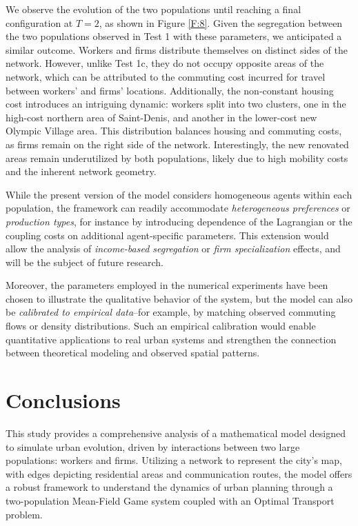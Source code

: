 \documentclass[smallextended,referee,envcountsect,]{svjour3}
\begin{document}
We observe the evolution of the two populations until reaching a final configuration at \(T = 2\), as shown in Figure \ref{F:8}. Given the segregation between the two populations observed in Test 1 with these parameters, we anticipated a similar outcome. Workers and firms distribute themselves on distinct sides of the network. However, unlike Test 1c, they do not occupy opposite areas of the network, which can be attributed to the commuting cost incurred for travel between workers' and firms' locations. Additionally, the non-constant housing cost introduces an intriguing dynamic: workers split into two clusters, one in the high-cost northern area of Saint-Denis, and another in the lower-cost new Olympic Village area. This distribution balances housing and commuting costs, as firms remain on the right side of the network. Interestingly, the new renovated areas remain underutilized by both populations, likely due to high mobility costs and the inherent network geometry.

{
While the present version of the model considers homogeneous agents within each population, 
the framework can readily accommodate \emph{heterogeneous preferences} or \emph{production types}, 
for instance by introducing dependence of the Lagrangian or the coupling costs on additional agent-specific parameters. 
This extension would allow the analysis of \emph{income-based segregation} or \emph{firm specialization} effects, 
and will be the subject of future research. 

Moreover, the parameters employed in the numerical experiments have been chosen to illustrate the qualitative behavior of the system, 
but the model can also be \emph{calibrated to empirical data}--for example, by matching observed commuting flows or density distributions. 
Such an empirical calibration would enable quantitative applications to real urban systems 
and strengthen the connection between theoretical modeling and observed spatial patterns.}






\section{Conclusions}

This study provides a comprehensive analysis of a mathematical model designed to simulate urban evolution, driven by interactions between two large populations: workers and firms. Utilizing a network to represent the city's map, with edges depicting residential areas and communication routes, the model offers a robust framework to understand the dynamics of urban planning through a two-population Mean-Field Game system coupled with an Optimal Transport problem.
\end{document}
